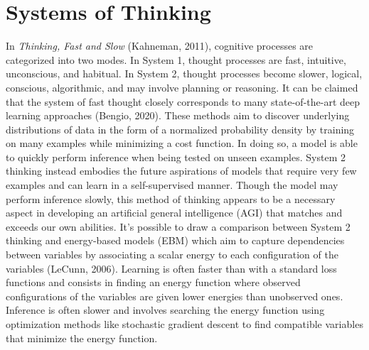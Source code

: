 \documentclass{article}
\begin{document}
\section{Systems of Thinking}

In \textit{Thinking, Fast and Slow} (Kahneman, 2011), cognitive processes are categorized into two modes. In System 1, thought processes are fast, intuitive, unconscious, and habitual. In System 2, thought processes become slower, logical, conscious, algorithmic, and may involve planning or reasoning. It can be claimed that the system of fast thought closely corresponds to many state-of-the-art deep learning approaches (Bengio, 2020). These methods aim to discover underlying distributions of data in the form of a normalized probability density by training on many examples while minimizing a cost function. In doing so, a model is able to quickly perform inference when being tested on unseen examples. 
System 2 thinking instead embodies the future aspirations of models that require very few examples and can learn in a self-supervised manner. Though the model may perform inference slowly, this method of thinking appears to be a necessary aspect in developing an artificial general intelligence (AGI) that matches and exceeds our own abilities. It's possible to draw a comparison between System 2 thinking and energy-based models (EBM) which aim to capture dependencies between variables by associating a scalar energy to each configuration of the variables (LeCunn, 2006). Learning is often faster than with a standard loss functions and consists in finding an energy function where observed configurations of the variables are given lower energies than unobserved ones. Inference is often slower and involves searching the energy function using optimization methods like stochastic gradient descent to find compatible variables that minimize the energy function. 

\end{document}
